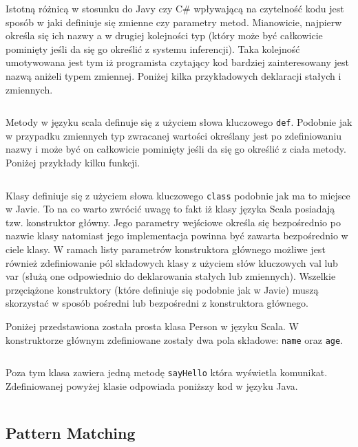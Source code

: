 \documentclass[brudnopis]{xmgr}
\begin{document}
Istotną różnicą w stosunku do Javy czy C\# wpływającą na czytelność kodu jest sposób w jaki definiuje się zmienne czy parametry metod. Mianowicie, najpierw określa się ich nazwy a w drugiej kolejności typ (który może być całkowicie pominięty jeśli da się go określić z systemu inferencji). Taka kolejność umotywowana jest tym iż programista czytający kod bardziej zainteresowany jest nazwą aniżeli typem zmiennej. Poniżej kilka przykładowych deklaracji stałych i zmiennych.

\inputminted{scala}{listings/scala/val-var-declarations.scala}

Metody w języku scala definuje się z użyciem słowa kluczowego \texttt{def}. Podobnie jak w przypadku zmiennych typ zwracanej wartości określany jest po zdefiniowaniu nazwy i może być on całkowicie pominięty jeśli da się go określić z ciała metody. Poniżej przykłady kilku funkcji.

\inputminted{scala}{listings/scala/functions-example.scala}

Klasy definiuje się z użyciem słowa kluczowego \texttt{class} podobnie jak ma to miejsce w Javie. To na co warto zwrócić uwagę to fakt iż klasy języka Scala posiadają tzw. konstruktor główny. Jego parametry wejściowe określa się bezpośrednio po nazwie klasy natomiast jego implementacja powinna być zawarta bezpośrednio w ciele klasy. W ramach listy parametrów konstruktora głównego możliwe jest również zdefiniowanie pól składowych klasy z użyciem słów kluczowych val lub var (służą one odpowiednio do deklarowania stałych lub zmiennych). Wszelkie przęciążone konstruktory (które definiuje się podobnie jak w Javie) muszą skorzystać w sposób pośredni lub bezpośredni z konstruktora głównego.

Poniżej przedstawiona została prosta klasa Person w języku Scala. W konstruktorze głównym zdefiniowane zostały dwa pola składowe: \texttt{name} oraz \texttt{age}.

\inputminted{scala}{listings/scala/simple-class-person.scala}

Poza tym klasa zawiera jedną metodę \texttt{sayHello} która wyświetla komunikat.
Zdefiniowanej powyżej klasie odpowiada poniższy kod w języku Java.

\inputminted{scala}{listings/java/simple-class-person.java}

\subsection{Pattern Matching}
\end{document}
